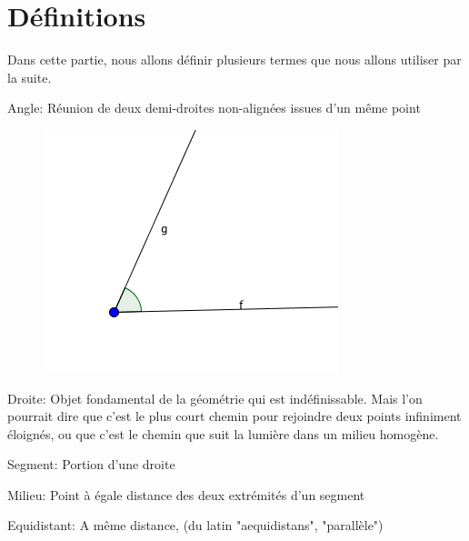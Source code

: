
%

%

\section{Définitions}
Dans cette partie, nous allons définir plusieurs termes que nous allons utiliser par la suite.\\

\begin{definition}{Angle:}
Réunion de deux demi-droites non-alignées issues d'un même point
\begin{figure}[H]
    \centering
    \includegraphics[scale=0.4]{definitions/angle.png}
\end{figure}
\end{definition}

\begin{definition}{Droite:}
Objet fondamental de la géométrie qui est indéfinissable. Mais l'on pourrait dire que c'est le plus court chemin pour rejoindre deux points infiniment éloignés, ou que c'est le chemin que suit la lumière dans un milieu homogène.
\end{definition}

\begin{definition}{Segment:}
Portion d'une droite
\end{definition}

\begin{definition}{Milieu:}
Point à égale distance des deux extrémités d'un segment
\end{definition}

\begin{definition}{Equidistant:}
A même distance, (du latin "aequidistans", "parallèle")
\end{definition}

